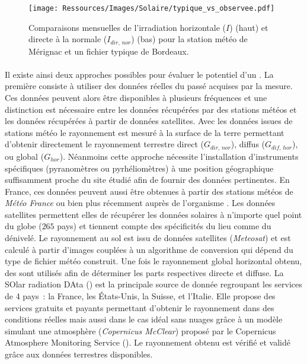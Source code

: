 \begin{figure}
    \centering
    \texttt{[image: Ressources/Images/Solaire/typique\_vs\_observee.pdf]}
    \caption[Comparaisons mensuelles de l’irradiation solaire entre un fichier typique et des données réelles]
            {Comparaisons mensuelles de l’irradiation horizontale ($I$) (haut) et
            directe à la normale ($I_{dir,\,nor}$) (bas) pour la station météo de Mérignac
            et un fichier typique de Bordeaux.}
    \label{fig:typique_vs_observee}
\end{figure}


\paragraph{} %
Il existe ainsi deux approches possibles pour évaluer le potentiel d’un .
La première consiste à utiliser des données réelles du passé
acquises par la mesure. Ces données peuvent alors être disponibles à plusieurs fréquences
et une distinction est nécessaire entre les données récupérées par des stations météos et
les données récupérées à partir de données satellites. Avec les données issues de stations
météo le rayonnement est mesuré à la surface de la terre permettant d’obtenir directement
le rayonnement terrestre direct ($G_{dir,\,nor}$), diffus ($G_{dif,\,hor}$), ou global
($G_{hor}$). Néanmoins cette approche nécessite l’installation d’instruments spécifiques
(pyranomètres ou pyrhéliomètres) à une position géographique suffisamment proche du
site étudié afin de fournir des données pertinentes. En France, ces données peuvent aussi
être obtenues à partir des stations météos de \textit{Météo France} ou bien plus récemment auprès
de l’organisme .
Les données satellites permettent elles de récupérer les données solaires à n’importe quel
point du globe ($265$ pays) et tiennent compte des spécificités du lieu comme du dénivelé.
Le rayonnement au sol est issu de données satellites (\textit{Meteosat}) et est
calculé à partir d’images couplées à un algorithme de conversion qui dépend du type de
fichier météo construit. Une fois le rayonnement global horizontal obtenu, des
sont utilisés afin de déterminer les parts respectives directe et diffuse. La SOlar
radiation DAta () est la principale source de
donnée regroupant les services de 4 pays~: la France, les États-Unis, la Suisse, et
l’Italie. Elle propose des services gratuits et payants permettant d’obtenir le
rayonnement dans des conditions réelles mais aussi dans le cas idéal sans nuages grâce à
un modèle simulant une atmosphère (\textit{Copernicus McClear}) proposé par le
Copernicus Atmosphere Monitoring Service ().
Le rayonnement obtenu est vérifié et validé grâce aux données terrestres disponibles.

